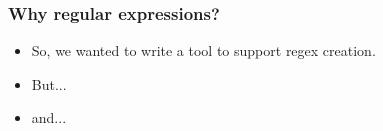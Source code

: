 \begin{frame}
\frametitle{Why regular expressions?}

\begin{itemize}
\item So, we wanted to write a tool to support regex creation.
\item<2-> But... 
\end{itemize}



\begin{itemize}
\item<4-> and...
\end{itemize}


\end{frame}



